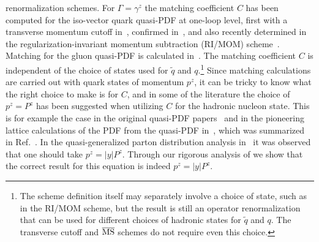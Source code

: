 renormalization schemes. For $\Gamma=\gamma^z$ the matching coefficient $C$ has been computed for the iso-vector quark quasi-PDF at one-loop level, first with a transverse momentum cutoff in~\cite{Xiong:2013bka}, confirmed in~\cite{Ma:2014jla,Alexandrou:2015rja}, and also recently determined in the regularization-invariant momentum subtraction (RI/MOM) scheme~\cite{Stewart:2017tvs}. Matching for the gluon quasi-PDF is calculated in~\cite{Wang:2017qyg,Wang:2017eel}. The matching coefficient $C$ is independent of the choice of states used for $\tilde q$ and $q$.\footnote{The scheme definition itself may separately involve a choice of state, such as in the RI/MOM scheme, but the result is still an operator renormalization that can be used for different choices of hadronic states for $\tilde q$ and $q$. The transverse cutoff and $\overline{\rm MS}$ schemes do not require even this choice.} Since matching calculations are carried out with quark states of momentum $p^z$, it can be tricky to know what the right choice to make is for $C$, and in some of the literature the choice of $p^z=P^z$ has been suggested when utilizing $C$ for the hadronic nucleon state. This is for example the case in the original quasi-PDF papers~\cite{Ji:2013dva,Ji:2014gla,Xiong:2013bka} and in the pioneering lattice calculations of the PDF from the quasi-PDF in~\cite{Lin:2014zya,Alexandrou:2015rja,Chen:2016utp,Alexandrou:2016jqi,Zhang:2017bzy,Alexandrou:2017huk,Chen:2017mzz,Lin:2017ani,Chen:2017gck}, which was summarized in Ref.~\cite{Lin:2017snn}. In the quasi-generalized parton distribution analysis in~\cite{Ji:2015qla} it was observed that one should take $p^z=|y|P^z$.  Through our rigorous analysis of  we show that the correct result for this equation is indeed $p^z=|y|P^z$.


